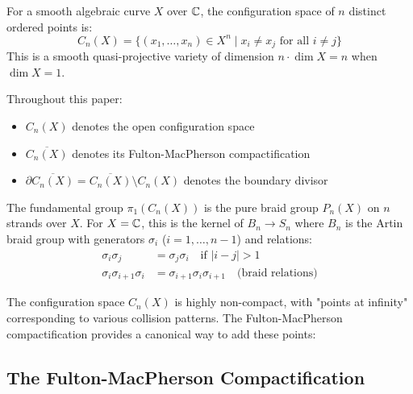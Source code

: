 \begin{definition}
For a smooth algebraic curve $X$ over $\mathbb{C}$, the configuration space of $n$ distinct ordered points is:
\[
C_n(X) = \{(x_1, \ldots, x_n) \in X^n \mid x_i \neq x_j \text{ for all } i \neq j\}
\]
This is a smooth quasi-projective variety of dimension $n \cdot \dim X = n$ when $\dim X = 1$.

\begin{notation}
Throughout this paper:
\begin{itemize}
\item $C_n(X)$ denotes the open configuration space
\item $\overline{C_n(X)}$ denotes its Fulton-MacPherson compactification  
\item $\partial\overline{C_n(X)} = \overline{C_n(X)} \setminus C_n(X)$ denotes the boundary divisor
\end{itemize}
\end{notation}

\end{definition}
 
\begin{proposition}
The fundamental group $\pi_1(C_n(X))$ is the pure braid group $P_n(X)$ on $n$ strands over $X$. For $X = \mathbb{C}$, this is the kernel of $B_n \to S_n$ where $B_n$ is the Artin braid group with generators $\sigma_i$ ($i = 1, \ldots, n-1$) and relations:
\begin{align}
\sigma_i\sigma_j &= \sigma_j\sigma_i \quad \text{if } |i-j| > 1 \\
\sigma_i\sigma_{i+1}\sigma_i &= \sigma_{i+1}\sigma_i\sigma_{i+1} \quad \text{(braid relations)}
\end{align}
\end{proposition}
 
The configuration space $C_n(X)$ is highly non-compact, with "points at infinity" corresponding to various collision patterns. The Fulton-MacPherson compactification provides a canonical way to add these points:
 
\subsection{The Fulton-MacPherson Compactification}
 
